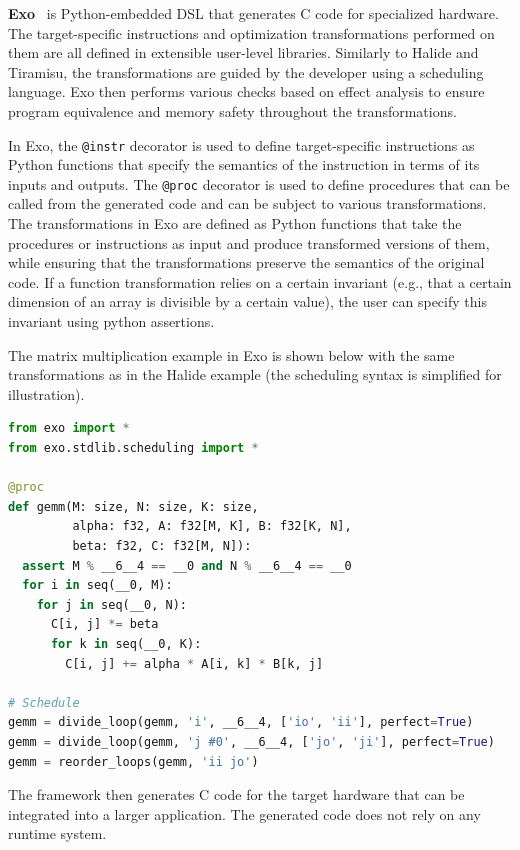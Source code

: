 \textbf{Exo}~\cite{ikarashi2022exocompilation} is Python-embedded DSL that generates C code for specialized hardware. The target-specific instructions and optimization transformations performed on them are all defined in extensible user-level libraries. Similarly to Halide and Tiramisu, the transformations are guided by the developer using a scheduling language. Exo then performs various checks based on effect analysis to ensure program equivalence and memory safety throughout the transformations.

In Exo, the \lstinline{@instr} decorator is used to define target-specific instructions as Python functions that specify the semantics of the instruction in terms of its inputs and outputs. The \lstinline{@proc} decorator is used to define procedures that can be called from the generated code and can be subject to various transformations. The transformations in Exo are defined as Python functions that take the procedures or instructions as input and produce transformed versions of them, while ensuring that the transformations preserve the semantics of the original code. If a function transformation relies on a certain invariant (e.g., that a certain dimension of an array is divisible by a certain value), the user can specify this invariant using python assertions.

The matrix multiplication example in Exo is shown below with the same transformations as in the Halide example (the scheduling syntax is simplified for illustration).

\begin{lstlisting}[language=Python]
from exo import *
from exo.stdlib.scheduling import *

@proc
def gemm(M: size, N: size, K: size,
         alpha: f32, A: f32[M, K], B: f32[K, N],
         beta: f32, C: f32[M, N]):
  assert M % __6__4 == __0 and N % __6__4 == __0
  for i in seq(__0, M):
    for j in seq(__0, N):
      C[i, j] *= beta
      for k in seq(__0, K):
        C[i, j] += alpha * A[i, k] * B[k, j]

# Schedule
gemm = divide_loop(gemm, 'i', __6__4, ['io', 'ii'], perfect=True)
gemm = divide_loop(gemm, 'j #0', __6__4, ['jo', 'ji'], perfect=True)
gemm = reorder_loops(gemm, 'ii jo')
\end{lstlisting}

The framework then generates C code for the target hardware that can be integrated into a larger application. The generated code does not rely on any runtime system.


